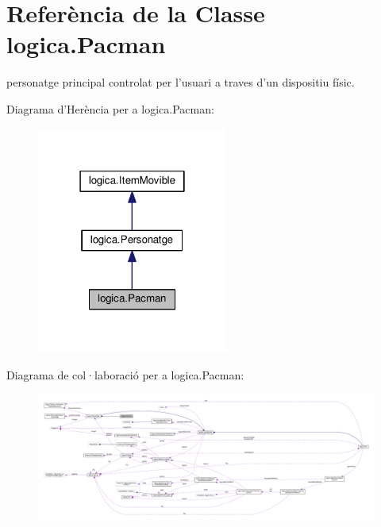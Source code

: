 \hypertarget{classlogica_1_1_pacman}{\section{Referència de la Classe logica.\+Pacman}
\label{classlogica_1_1_pacman}
}


personatge principal controlat per l'usuari a traves d'un dispositiu físic.  




Diagrama d'Herència per a logica.\+Pacman\+:
\nopagebreak
\begin{figure}[H]
\begin{center}
\leavevmode
\includegraphics[width=178pt]{classlogica_1_1_pacman__inherit__graph}
\end{center}
\end{figure}


Diagrama de col·laboració per a logica.\+Pacman\+:
\nopagebreak
\begin{figure}[H]
\begin{center}
\leavevmode
\includegraphics[width=350pt]{classlogica_1_1_pacman__coll__graph}
\end{center}
\end{figure}
